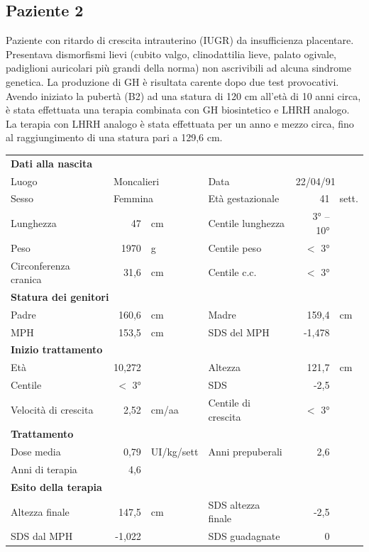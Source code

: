 \subsection*{Paziente 2}%

Paziente con ritardo di crescita intrauterino (IUGR) da insufficienza placentare.
Presentava dismorfismi lievi (cubito valgo, clinodattilia lieve, palato ogivale, padiglioni auricolari più grandi della norma) non ascrivibili ad alcuna sindrome genetica. La produzione di GH è risultata carente dopo due test provocativi. Avendo iniziato la pubertà (B2) ad una statura di 120 cm all'età di 10 anni circa, è stata effettuata una terapia combinata con GH biosintetico e LHRH analogo. La terapia con LHRH analogo è stata effettuata per un anno e mezzo circa, fino al raggiungimento di una statura pari a 129,6 cm.

\begin{table}[!h]
\begin{tabular}{lrllrl}
\toprule
\multicolumn{6}{l}{\textbf{Dati alla nascita}}\\
Luogo 		& \multicolumn{2}{l}{Moncalieri} 	& Data 					& \multicolumn{2}{l}{22/04/91} 	\\
Sesso 		& \multicolumn{2}{l}{Femmina} 	& Età gestazionale 		& 41 		& sett.\\
Lunghezza 	& 47 		& cm 				& Centile lunghezza		& 3° -- 10°	\\
Peso 		& 1970 		& g					& Centile peso			& $<$ 3° 		\\
Circonferenza cranica	& 31,6 		& cm 	& Centile c.c.			& $<$ 3° \\
\midrule
\multicolumn{6}{l}{\textbf{Statura dei genitori}}\\
Padre 		& 160,6 & cm 	& Madre 				& 159,4 & cm \\
MPH 		& 153,5 & cm 	& SDS del MPH 			& -1,478\\
\midrule
\multicolumn{6}{l}{\textbf{Inizio trattamento}} \\
Età	& 10,272 & 		& Altezza 				& 121,7 & cm  \\
Centile & $<$ 3° 	 &		& SDS		& -2,5 \\
Velocità di crescita & 2,52 & cm/aa	& Centile di crescita & $<$ 3°\\
\midrule
\multicolumn{6}{l}{\textbf{Trattamento}} \\
Dose media		& 0,79 & UI/kg/sett & Anni prepuberali & 2,6\\
Anni di terapia & 4,6\\
\midrule
\multicolumn{6}{l}{\textbf{Esito della terapia}} \\
Altezza finale			& 147,5 & cm 	& SDS altezza finale & -2,5\\
SDS dal MPH	& -1,022 	& 	& SDS guadagnate 			& 0\\
\bottomrule
\end{tabular}
\end{table}



